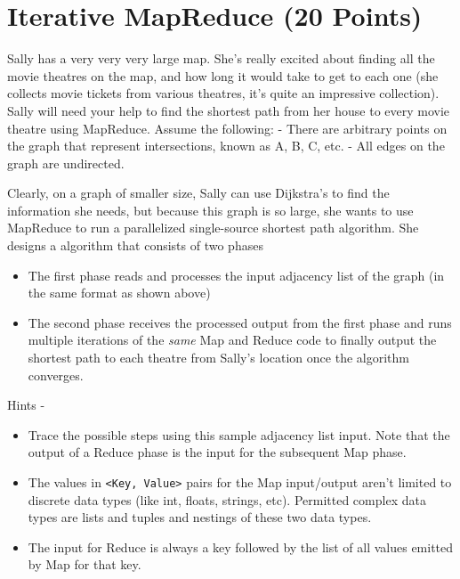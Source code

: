 \documentclass{article}
\begin{document}
\section{Iterative MapReduce (20 Points)}
Sally has a very very very large map. She’s really excited about finding all the movie theatres on the map, and how long it would take to get to each one (she collects movie tickets from various theatres,
it’s quite an impressive collection). Sally will need your help to find the shortest path from her house to every movie theatre using MapReduce.
Assume the following:
- There are arbitrary points on the graph that represent intersections, known as A, B, C, etc.
- All edges on the graph are undirected.

Clearly, on a graph of smaller size, Sally can use Dijkstra’s to find the information she needs, but because this graph is so large, she wants to use MapReduce to run a parallelized single-source shortest path algorithm. She designs a algorithm that consists of two phases
\begin{itemize}
\item The first phase reads and processes the input adjacency list of the graph (in the same format as shown above)
\item The second phase receives the processed output from the first phase and runs multiple iterations of the \textit{same} Map and Reduce code to finally output the shortest path to each theatre from Sally's location once the algorithm converges.
\end{itemize}

Hints - 
\begin{itemize}
\item Trace the possible steps using this sample adjacency list input. Note that the output of a Reduce phase is the input for the subsequent Map phase.
\item The values in \verb|<Key, Value>| pairs for the Map input/output aren't limited to discrete data types (like int, floats, strings, etc). Permitted complex data types are lists and tuples and nestings of these two data types.
\item The input for Reduce is always a key followed by the list of all values emitted by Map for that key.
\end{itemize}
\end{document}

